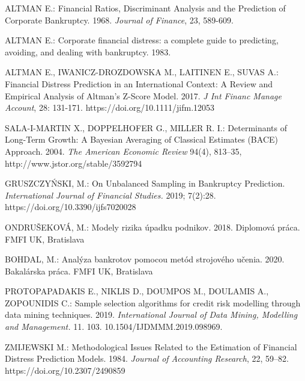 \begin{thebibliography}{99}

     ALTMAN E.: Financial Ratios, Discriminant Analysis and the Prediction of Corporate Bankruptcy. 1968. \emph{Journal of Finance}, 23, 589-609. 

     ALTMAN E.: Corporate financial distress: a complete guide to predicting, avoiding, and dealing with bankruptcy. 1983.

     ALTMAN E., IWANICZ-DROZDOWSKA M., LAITINEN E., SUVAS A.:
    Financial Distress Prediction in an International Context: A Review and Empirical Analysis of Altman's Z-Score Model. 2017.
    \emph{J Int Financ Manage Account}, 28: 131-171. https://doi.org/10.1111/jifm.12053

     SALA-I-MARTIN X., DOPPELHOFER G., MILLER R. I.: Determinants of Long-Term Growth: A Bayesian Averaging of Classical Estimates (BACE) Approach. 2004.
    \emph{The American Economic Review} 94(4), 813–35, http://www.jstor.org/stable/3592794

     GRUSZCZYŃSKI, M.: On Unbalanced Sampling in Bankruptcy Prediction. \emph{International Journal of Financial Studies.} 2019; 7(2):28. https://doi.org/10.3390/ijfs7020028

     ONDRUŠEKOVÁ, M.: Modely rizika úpadku podnikov. 2018. Diplomová práca. FMFI UK, Bratislava
    
     BOHDAL, M.: Analýza bankrotov pomocou metód strojového učenia. 2020. Bakalárska práca. FMFI UK, Bratislava

     PROTOPAPADAKIS E., NIKLIS D., DOUMPOS M., DOULAMIS A., ZOPOUNIDIS C.: Sample selection algorithms for credit risk modelling through data mining techniques. 2019.
    \emph{International Journal of Data Mining, Modelling and Management.} 11. 103. 10.1504/IJDMMM.2019.098969.

     ZMIJEWSKI M.: Methodological Issues Related to the Estimation of Financial Distress Prediction Models. 1984. \emph{Journal of Accounting Research}, 22, 59–82. https://doi.org/10.2307/2490859

\end{thebibliography}
